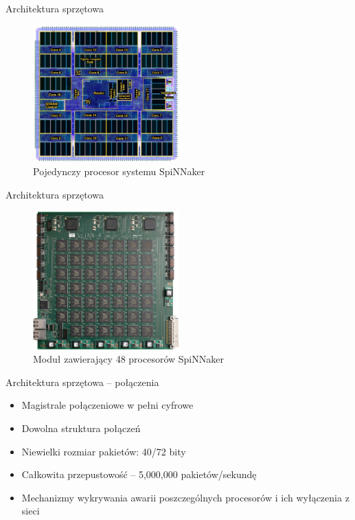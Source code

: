 \documentclass{beamer}
\begin{document}
\begin{frame}{Architektura sprzętowa}

\begin{figure}[H]
  \centering
    \includegraphics[width=0.5\textwidth]{spinnaker_chip.png}
\caption{Pojedynczy procesor systemu SpiNNaker}
\end{figure}

\end{frame}

\begin{frame}{Architektura sprzętowa}

\begin{figure}[H]
  \centering
    \includegraphics[width=0.5\textwidth]{spinnaker_pcb.jpg}
\caption{Moduł zawierający 48 procesorów SpiNNaker}
\end{figure}

\end{frame}


\begin{frame}{Architektura sprzętowa -- połączenia}

\begin{itemize}

\item Magistrale połączeniowe w pełni cyfrowe

\item Dowolna struktura połączeń

\item Niewielki rozmiar pakietów: 40/72 bity

\item Całkowita przepustowość -- 5,000,000 pakietów/sekundę

\item Mechanizmy wykrywania awarii poszczególnych procesorów i ich wyłączenia z sieci

\end{itemize}

\end{frame}
\end{document}
